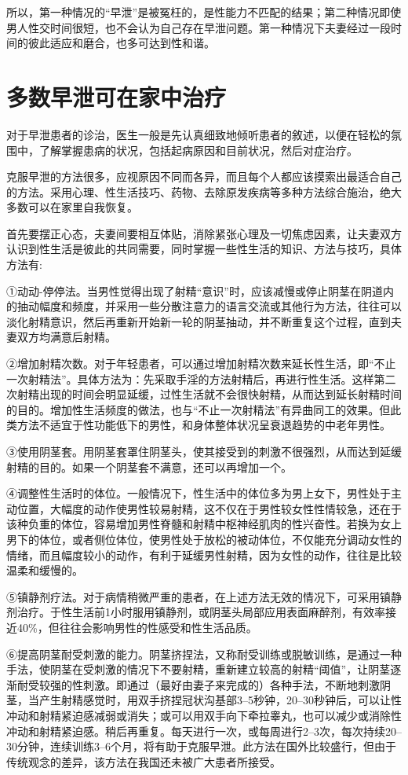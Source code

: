 \documentclass[12pt,UTF8]{ctexbook}
\begin{document}
所以，第一种情况的“早泄”是被冤枉的，是性能力不匹配的结果；第二种情况即使男人性交时间很短，也不会认为自己存在早泄问题。第一种情况下夫妻经过一段时间的彼此适应和磨合，也多可达到性和谐。

\section{多数早泄可在家中治疗}

对于早泄患者的诊治，医生一般是先认真细致地倾听患者的敘述，以便在轻松的氛围中，了解掌握患病的状况，包括起病原因和目前状况，然后对症治疗。

克服早泄的方法很多，应视原因不同而各异，而且每个人都应该摸索出最适合自己的方法。采用心理、性生活技巧、药物、去除原发疾病等多种方法综合施治，绝大多数可以在家里自我恢复。

首先要摆正心态，夫妻间要相互体贴，消除紧张心理及一切焦虑因素，让夫妻双方认识到性生活是彼此的共同需要，同时掌握一些性生活的知识、方法与技巧，具体方法有:

①动动-停停法。当男性觉得出现了射精“意识”时，应该减慢或停止阴茎在阴道内的抽动幅度和频度，并采用一些分散注意力的语言交流或其他行为方法，往往可以淡化射精意识，然后再重新开始新一轮的阴茎抽动，并不断重复这个过程，直到夫妻双方均满意后射精。

②增加射精次数。对于年轻患者，可以通过增加射精次数来延长性生活，即“不止一次射精法”。具体方法为：先采取手淫的方法射精后，再进行性生活。这样第二次射精出现的时间会明显延缓，过性生活就不会很快射精，从而达到延长射精时间的目的。增加性生活频度的做法，也与“不止一次射精法”有异曲同工的效果。但此类方法不适宜于性功能低下的男性，和身体整体状况呈衰退趋势的中老年男性。

③使用阴茎套。用阴茎套罩住阴茎头，使其接受到的刺激不很强烈，从而达到延缓射精的目的。如果一个阴茎套不满意，还可以再增加一个。

④调整性生活时的体位。一般情况下，性生活中的体位多为男上女下，男性处于主动位置，大幅度的动作使男性较易射精，这不仅在于男性较女性性情较急，还在于该种负重的体位，容易增加男性脊髓和射精中枢神经肌肉的性兴奋性。若换为女上男下的体位，或者侧位体位，使男性处于放松的被动体位，不仅能充分调动女性的情绪，而且幅度较小的动作，有利于延缓男性射精，因为女性的动作，往往是比较温柔和缓慢的。

⑤镇静剂疗法。对于病情稍微严重的患者，在上述方法无效的情况下，可采用镇静剂治疗。于性生活前1小时服用镇静剂，或阴茎头局部应用表面麻醉剂，有效率接近40\%，但往往会影响男性的性感受和性生活品质。

⑥提高阴茎耐受刺激的能力。阴茎挤捏法，又称耐受训练或脱敏训练，是通过一种手法，使阴茎在受刺激的情况下不要射精，重新建立较高的射精“阈值”，让阴茎逐渐耐受较强的性刺激。即通过（最好由妻子来完成的）各种手法，不断地刺激阴茎，当产生射精感觉时，用双手挤捏冠状沟基部3--5秒钟，20--30秒钟后，可以让性冲动和射精紧迫感减弱或消失；或可以用双手向下牵拉睾丸，也可以减少或消除性冲动和射精紧迫感。稍后再重复。每天进行一次，或每周进行2--3次，每次持续20--30分钟，连续训练3--6个月，将有助于克服早泄。此方法在国外比较盛行，但由于传统观念的差异，该方法在我国还未被广大患者所接受。
\end{document}
